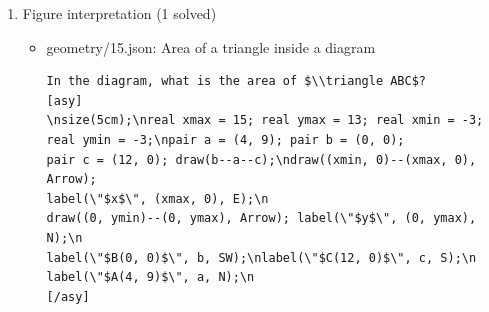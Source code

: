 \documentclass[11pt,a4paper]{article}
\begin{document}
\begin{enumerate}
  \item Figure interpretation (1 solved)
    \begin{itemize}
      \item geometry/15.json: Area of a triangle inside a diagram
\begin{verbatim}
In the diagram, what is the area of $\\triangle ABC$?
[asy]
\nsize(5cm);\nreal xmax = 15; real ymax = 13; real xmin = -3;
real ymin = -3;\npair a = (4, 9); pair b = (0, 0);
pair c = (12, 0); draw(b--a--c);\ndraw((xmin, 0)--(xmax, 0), Arrow);
label(\"$x$\", (xmax, 0), E);\n
draw((0, ymin)--(0, ymax), Arrow); label(\"$y$\", (0, ymax), N);\n
label(\"$B(0, 0)$\", b, SW);\nlabel(\"$C(12, 0)$\", c, S);\n
label(\"$A(4, 9)$\", a, N);\n
[/asy]
\end{verbatim}
    \end{itemize}

\end{enumerate}
\end{document}
